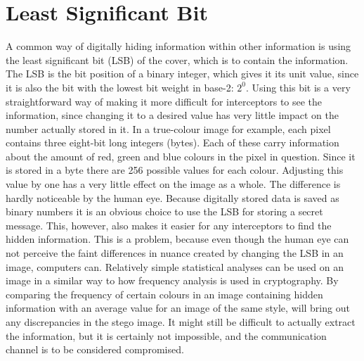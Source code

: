 \section{Least Significant Bit}
A common way of digitally hiding information within other information is using the least significant bit (LSB) of the cover, which is to contain the information. 
The LSB is the bit position of a binary integer, which gives it its unit value, since it is also the bit with the lowest bit weight in base-2: $2^0$.
Using this bit is a very straightforward way of making it more difficult for interceptors to see the information, since changing it to a desired value has very little impact on the number actually stored in it.
In a true-colour image for example, each pixel contains three eight-bit long integers (bytes). Each of these carry information about the amount of red, green and blue colours in the pixel in question.
Since it is stored in a byte there are 256 possible values for each colour. Adjusting this value by one has a very little effect on the image as a whole. The difference is hardly noticeable by the human eye.
Because digitally stored data is saved as binary numbers it is an obvious choice to use the LSB for storing a secret message. This, however, also makes it easier for any interceptors to find the hidden information.
This is a problem, because even though the human eye can not perceive the  faint differences in nuance created by changing the LSB in an image, computers can. 
Relatively simple statistical analyses can be used on an image in a similar way to how frequency analysis is used in cryptography. 
By comparing the frequency of certain colours in an image containing hidden information with an average value for an image of the same style, will bring out any discrepancies in the stego image. 
It might still be difficult to actually extract the information, but it is certainly not impossible, and the communication channel is to be considered compromised.